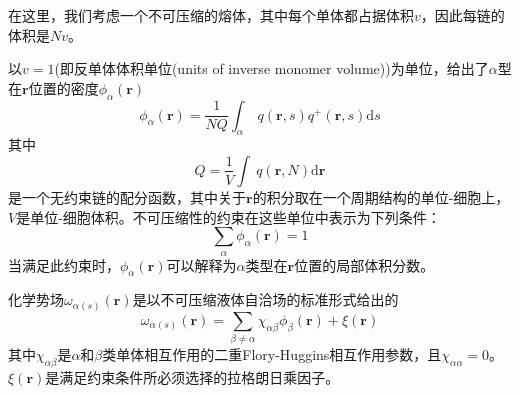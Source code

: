 \documentclass[12pt,a4paper]{article}
\begin{document}
在这里，我们考虑一个不可压缩的熔体，其中每个单体都占据体积$v$，因此每链的体积是$Nv$。

以$v=1$(即反单体体积单位(units of inverse monomer volume))为单位，给出了$\alpha$型在$\mathbf{r}$位置的密度$\phi_{\alpha}(\mathbf{r})$
\begin{equation}\label{3}
\phi_{\alpha}(\mathbf{r})=\frac{1}{NQ}\int _{\alpha}~q(\mathbf{r},s)q^{+}(\mathbf{r},s) \mathrm{d}s
\end{equation}
其中
\begin{equation}\label{4}
Q=\frac{1}{V}\int ~q(\mathbf{r},N) \mathrm{d}\mathbf{r}
\end{equation}
是一个无约束链的配分函数，其中关于$\mathbf{r}$的积分取在一个周期结构的单位-细胞上，$V$是单位-细胞体积。不可压缩性的约束在这些单位中表示为下列条件：
\begin{equation}\label{5}
\sum _{\alpha}\phi_{\alpha}(\mathbf{r})=1
\end{equation}
当满足此约束时，$\phi_{\alpha}(\mathbf{r})$可以解释为$\alpha$类型在$\mathbf{r}$位置的局部体积分数。

化学势场$\omega_{\alpha (s)}(\mathbf{r})$是以不可压缩液体自洽场的标准形式给出的
\begin{equation}\label{6}
\omega_{\alpha (s)}(\mathbf{r})=\sum _{\beta \neq \alpha} \chi_{\alpha \beta}\phi_{\beta}(\mathbf{r})+\xi(\mathbf{r})
\end{equation}
其中$\chi_{\alpha\beta}$是$\alpha$和$\beta$类单体相互作用的二重Flory-Huggins相互作用参数，且$\chi_{\alpha \alpha}=0$。$\xi(\mathbf{r})$是满足约束条件所必须选择的拉格朗日乘因子。
\end{document}
